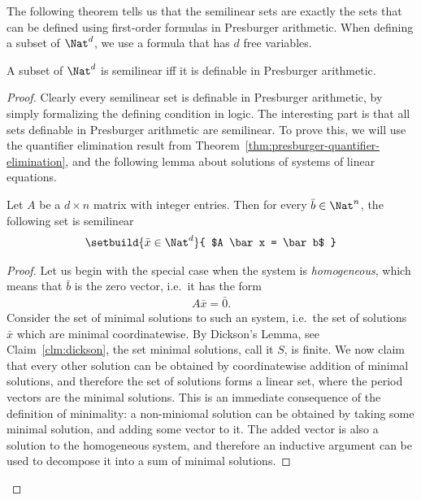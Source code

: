 The following theorem tells us that the semilinear sets are exactly the sets that can be defined using first-order formulas in Presburger arithmetic. When defining a subset of $\Nat^d$, we use a formula that has $d$ free variables.

\begin{theorem}\label{thm:presburger-semilinear}
	A subset of $\Nat^d$ is semilinear iff it is definable in Presburger arithmetic.
\end{theorem}
\begin{proof}
	Clearly every semilinear set is definable in Presburger arithmetic, by simply formalizing the defining condition in logic. The interesting part is that all sets definable in Presburger arithmetic are semilinear. To prove this, we will use the quantifier elimination result from Theorem~\ref{thm:presburger-quantifier-elimination}, and the following lemma about  solutions of systems of linear equations.



	\begin{lemma}\label{lem:linear-solutions-semilinear}
		Let $A$ be a $d \times n$ matrix with integer entries. Then for every $\bar b \in \Nat^n$, the following set  is semilinear
		\begin{align*}
		\setbuild{ \bar x \in \Nat^d}{
			$A \bar x = \bar b$
		}
		\end{align*}
	\end{lemma}
\begin{proof}
	Let us begin with the special case when the system is \emph{homogeneous}, which means that $\bar b$ is the zero vector, i.e.~it has the form
	\begin{align}\label{eq:homogeneous-system}
		A \bar x = \bar 0.
		\end{align}
	Consider the set of minimal solutions to such an system, i.e.~the set  of solutions $\bar x$  
	which are minimal coordinatewise. By Dickson's Lemma, see Claim~\ref{clm:dickson},  the set minimal solutions, call it $S$, is finite.  We now claim that every other solution can be obtained by coordinatewise addition of minimal solutions, and therefore the set of solutions forms a linear set, where the period vectors are the minimal solutions. This is an immediate consequence of the definition of minimality: a non-miniomal solution can be obtained by taking some minimal solution, and adding some vector to it. The added vector is also a solution to the homogeneous system, and therefore an inductive argument can be used to decompose it into a sum of minimal solutions.


\end{proof}
\end{proof}
